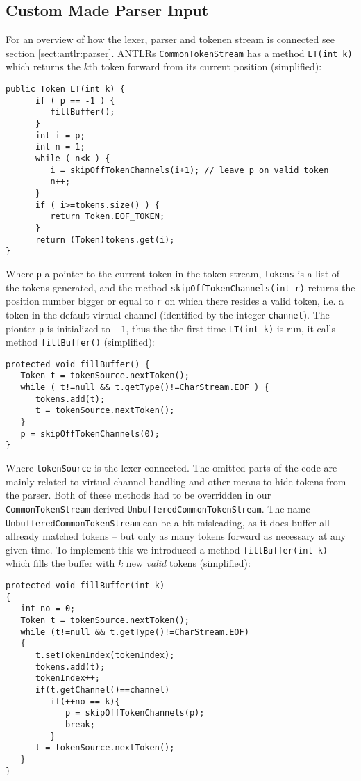 \subsection{Custom Made Parser Input}
For an overview of how the lexer, parser and tokenen stream is connected see section \ref{sect:antlr:parser}. ANTLRs \verb!CommonTokenStream! has a method \verb!LT(int k)! which returns the $k$th token forward from its current position (simplified):
\begin{verbatim}
public Token LT(int k) {
      if ( p == -1 ) {
         fillBuffer();
      }
      int i = p;
      int n = 1;
      while ( n<k ) {
         i = skipOffTokenChannels(i+1); // leave p on valid token
         n++;
      }
      if ( i>=tokens.size() ) {
         return Token.EOF_TOKEN;
      }
      return (Token)tokens.get(i);
}
\end{verbatim}
Where \verb!p! a pointer to the current token in the token stream, \verb!tokens! is a list of the tokens generated, and the method \verb!skipOffTokenChannels(int r)! returns the position number bigger or equal to \verb!r! on which there resides a valid token, i.e. a token in the default virtual channel (identified by the integer \verb!channel!). The pionter \verb!p! is initialized to $-1$, thus the the first time \verb!LT(int k)! is run, it calls method \verb!fillBuffer()! (simplified):
\begin{verbatim}
protected void fillBuffer() {
   Token t = tokenSource.nextToken();
   while ( t!=null && t.getType()!=CharStream.EOF ) {
      tokens.add(t);
      t = tokenSource.nextToken();
   }
   p = skipOffTokenChannels(0);
}
\end{verbatim}
Where \verb!tokenSource! is the lexer connected. The omitted parts of the code are mainly related to virtual channel handling and other means to hide tokens from the parser. Both of these methods had to be overridden in our \verb!CommonTokenStream! derived \verb!UnbufferedCommonTokenStream!. The name \verb!UnbufferedCommonTokenStream! can be a bit misleading, as it does buffer all allready matched tokens -- but only as many tokens forward as necessary at any given time. To implement this we introduced a method \verb!fillBuffer(int k)! which fills the buffer with $k$ new \emph{valid} tokens (simplified):
\begin{verbatim}
protected void fillBuffer(int k) 
{
   int no = 0;
   Token t = tokenSource.nextToken();
   while (t!=null && t.getType()!=CharStream.EOF) 
   {
      t.setTokenIndex(tokenIndex);
      tokens.add(t);
      tokenIndex++;
      if(t.getChannel()==channel)
         if(++no == k){
            p = skipOffTokenChannels(p);
            break;
         }
      t = tokenSource.nextToken();
   }
}
\end{verbatim}
